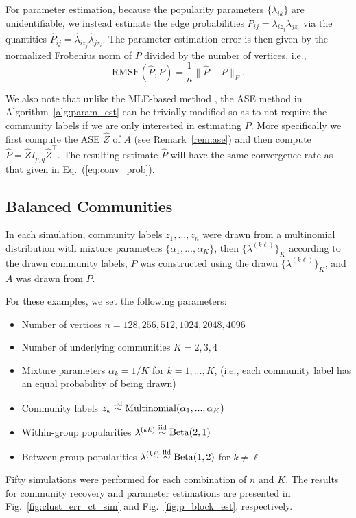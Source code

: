 \documentclass[12pt]{article}
\providecommand{\tightlist}{%
  \setlength{\itemsep}{0pt}\setlength{\parskip}{0pt}}
\begin{document}
For parameter estimation, because the popularity parameters
$\{\lambda_{ik}\}$ are unidentifiable, we instead estimate the edge
probabilities $P_{ij} = \lambda_{i z_j} \lambda_{j z_i}$ via the
quantities $\hat{P}_{ij} = \hat{\lambda}_{iz_j} \hat{\lambda}_{jz_i}$. The
parameter estimation error is then given by the normalized 
Frobenius norm of $P$ divided by the number of vertices, i.e.,
$$\mathrm{RMSE}(\hat{P}, P) = \frac{1}{n} \|\hat{P} - P\|_F.$$

We also note that unlike the MLE-based method
\citep{307cbeb9b1be48299388437423d94bf1}, the ASE method in
Algorithm~\ref{alg:param_est} can be trivially modified so as to not
require the community labels if we are only interested in 
estimating $P$. More specifically we first compute the ASE
$\hat{Z}$ of $A$ (see Remark~\ref{rem:ase}) and then compute $\hat{P}
= \hat{Z} I_{p,q} \hat{Z}^{\top}$. The resulting estimate $\hat{P}$
will have the same convergence rate as that given in Eq.~(\ref{eq:conv_prob}).

\hypertarget{balanced-communities}{%
\subsection{Balanced Communities}\label{balanced-communities}}

In each simulation, community labels \(z_1, ..., z_n\) were drawn from a
multinomial distribution with mixture parameters
\(\{\alpha_1, ..., \alpha_K\}\), then \(\{\lambda^{(k \ell)}\}_K\) according
to the drawn community labels, \(P\) was constructed using the drawn
\(\{\lambda^{(k \ell)}\}_K\), and \(A\) was drawn from \(P\).

For these examples, we set the following parameters:

\begin{itemize}
\tightlist
\item
  Number of vertices \(n = 128, 256, 512, 1024, 2048, 4096\)
\item
  Number of underlying communities \(K = 2, 3, 4\)
\item
  Mixture parameters \(\alpha_k = 1 / K\) for \(k = 1, ..., K\), (i.e.,
  each community label has an equal probability of being drawn)
\item
  Community labels
  \(z_k \stackrel{\text{iid}}{\sim} \mathrm{Multinomial}(\alpha_1, ..., \alpha_K)\)
\item
  Within-group popularities
  \(\lambda^{(kk)} \stackrel{\text{iid}}{\sim} \mathrm{Beta}(2, 1)\)
\item
  Between-group popularities
  \(\lambda^{(k \ell)} \stackrel{\text{iid}}{\sim} \mathrm{Beta}(1, 2)\) for
  \(k \neq \ell\)
\end{itemize}
Fifty simulations were performed for each combination of $n$ and
$K$. The results for community recovery and parameter estimations are
presented in Fig.~\ref{fig:clust_err_ct_sim} and
Fig.~\ref{fig:p_block_est}, respectively.
\end{document}
